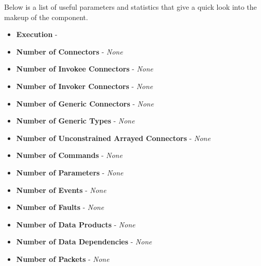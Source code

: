 Below is a list of useful parameters and statistics that give a quick look into the makeup of the component.

\begin{itemize}
  \item \textbf{Execution} - 
    \textit{}

  \item \textbf{Number of Connectors} - 
    \textit{None}

  \item \textbf{Number of Invokee Connectors} -
    \textit{None}
    
  \item \textbf{Number of Invoker Connectors} -
    \textit{None}

  \item \textbf{Number of Generic Connectors} - 
    \textit{None}

  \item \textbf{Number of Generic Types} - 
    \textit{None}

  \item \textbf{Number of Unconstrained Arrayed Connectors} - 
    \textit{None}
    
  \item \textbf{Number of Commands} -
    \textit{None}

  \item \textbf{Number of Parameters} -
    \textit{None}

  \item \textbf{Number of Events} - 
    \textit{None}

  \item \textbf{Number of Faults} - 
    \textit{None}

  \item \textbf{Number of Data Products} - 
    \textit{None}

  \item \textbf{Number of Data Dependencies} - 
    \textit{None}

  \item \textbf{Number of Packets} - 
    \textit{None}
\end{itemize}
